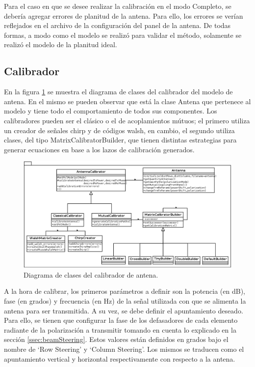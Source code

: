 Para el caso en que se desee realizar la calibración en el modo Completo, se debería agregar errores de planitud de la antena.
Para ello, los errores se verían reflejados en el archivo de la configuración del panel de la antena. De todas formas, a modo 
como el modelo se realizó para validar el método, solamente se realizó el modelo de la planitud ideal.

\subsection{Calibrador}

En la figura \ref{fig:modelPackage} se muestra el diagrama de clases del calibrador del modelo de antena. En el mismo se pueden 
observar que está la clase Antena que pertenece al modelo y tiene todo el comportamiento de todos sus componentes. Los 
calibradores pueden ser el clásico o el de acoplamientos mútuos; el primero utiliza un creador de señales chirp y de códigos
walsh, en cambio, el segundo utiliza clases, del tipo MatrixCalibratorBuilder, que tienen distintas estrategias para generar 
ecuaciones en base a los lazos de calibración generados.

\begin{figure}
 \centering
 \includegraphics[width=15cm]{gfx/modelPackage.png}
 \caption{Diagrama de clases del calibrador de antena.}
 \label{fig:modelPackage}
\end{figure}


A la hora de calibrar, los primeros parámetros a definir son la potencia (en dB), fase (en grados) y frecuencia (en Hz) de la 
señal utilizada con que se alimenta la antena para ser transmitida. A su vez, se debe definir el apuntamiento deseado. Para 
ello, se tienen que configurar la fase de los defasadores de cada elemento radiante de la polarización a transmitir tomando 
en cuenta lo explicado en la sección \ref{ssec:beamSteering}. Estos valores están definidos en grados bajo el nombre de 
\enquote*{Row Steering} y \enquote*{Column Steering}. Los mismos se traducen como el apuntamiento vertical y horizontal 
respectivamente con respecto a la antena.

